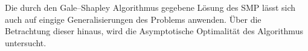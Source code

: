 Die durch den Gale–Shapley Algorithmus\cite{Gale:1962} gegebene Lösung des SMP lässt sich auch auf eingige Generalisierungen des Problems anwenden. Über die Betrachtung dieser hinaus, wird die Asymptotische Optimalität des Algorithmus untersucht.

